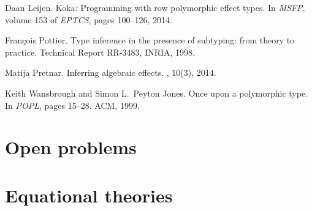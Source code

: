 \documentclass[a4paper,UKenglish]{dagrep}
\begin{document}
\begin{thebibliography}{1}

Daan Leijen.
\newblock Koka: Programming with row polymorphic effect types.
\newblock In {\em {MSFP}}, volume 153 of {\em {EPTCS}}, pages 100--126, 2014.

Fran{\c{c}}ois Pottier.
\newblock Type inference in the presence of subtyping: from theory to practice.
\newblock Technical Report RR-3483, INRIA, 1998.

Matija Pretnar.
\newblock Inferring algebraic effects.
, 10(3), 2014.

Keith Wansbrough and Simon L.~Peyton Jones.
\newblock Once upon a polymorphic type.
\newblock In {\em {POPL}}, pages 15--28. {ACM}, 1999.

\end{thebibliography}





\section{Open problems}

\license

\newcommand{\chooseop}{\mathtt{choose}}
\newcommand{\comm}{\mathtt{comm}}
\newcommand{\assoc}{\mathtt{assoc}}
\newcommand{\idem}{\mathtt{idem}}
\newcommand{\ops}{\mathcal{O}}
\newcommand{\eqs}{\mathcal{E}}
\newcommand{\intty}{\mathtt{int}}
\newcommand{\hto}{\Rightarrow}

\section{Equational theories}
\end{document}

